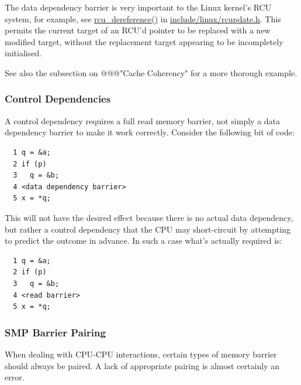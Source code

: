 The data dependency barrier is very important to the Linux kernel's
RCU system, for example,
see \url{rcu_dereference()} in \url{include/linux/rcupdate.h}.
This permits the current
target of an RCU'd pointer to be replaced with a new modified target, without
the replacement target appearing to be incompletely initialised.

See also the subsection on @@@"Cache Coherency" for a more thorough example.

\subsubsection{Control Dependencies}
\label{sec:advsync:Control Dependencies}

A control dependency requires a full read memory barrier, not simply a data
dependency barrier to make it work correctly.  Consider the following bit of
code:

\vspace{5pt}
\begin{minipage}[t]{\columnwidth}
\small
\begin{verbatim}
  1 q = &a;
  2 if (p)
  3   q = &b;
  4 <data dependency barrier>
  5 x = *q;
\end{verbatim}
\end{minipage}
\vspace{5pt}

This will not have the desired effect because there is no actual data
dependency, but rather a control dependency that the CPU may short-circuit by
attempting to predict the outcome in advance.  In such a case what's actually
required is:

\vspace{5pt}
\begin{minipage}[t]{\columnwidth}
\small
\begin{verbatim}
  1 q = &a;
  2 if (p)
  3   q = &b;
  4 <read barrier>
  5 x = *q;
\end{verbatim}
\end{minipage}
\vspace{5pt}

\subsubsection{SMP Barrier Pairing}
\label{sec:advsync:SMP Barrier Pairing}

When dealing with CPU-CPU interactions, certain types of memory barrier should
always be paired.  A lack of appropriate pairing is almost certainly an error.

